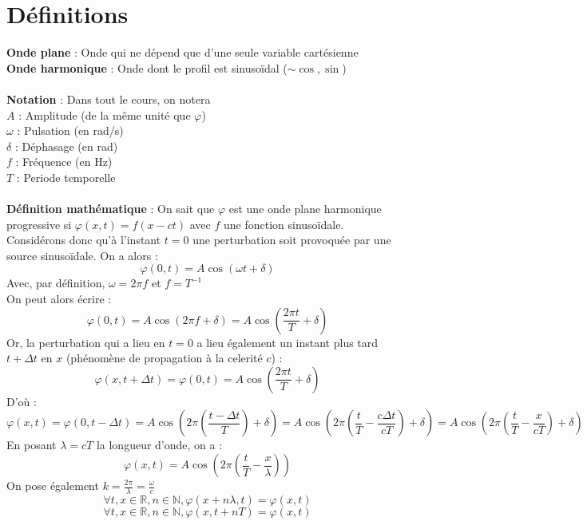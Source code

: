 \section{Définitions}
\noindent\textbf{Onde plane} : Onde qui ne dépend que d'une seule variable cartésienne \\
\textbf{Onde harmonique} : Onde dont le profil est sinusoïdal ($\sim \cos, \sin$) \\
\\
\textbf{Notation} : Dans tout le cours, on notera \\
\indent $A$ : Amplitude (de la même unité que $\varphi$) \\
\indent $\omega$ : Pulsation (en rad/s) \\
\indent $\delta$ : Déphasage (en rad) \\
\indent $f$ : Fréquence (en Hz)\\
\indent $T$ : Periode temporelle \\\\
\noindent\textbf{Définition mathématique} :
On sait que $\varphi$ est une onde plane harmonique progressive si $\varphi(x,t)=f(x-ct)$ avec $f$ une fonction sinusoïdale.\\
Considérons donc qu'à l'instant $t=0$ une perturbation soit provoquée par une source sinusoïdale. On a alors :
\[\varphi(0,t)=A\cos(\omega t +\delta)\]
Avec, par définition, $\omega=2\pi f$ et $f=T^{-1}$\\
On peut alors écrire : \[\varphi(0,t)=A\cos(2\pi f+\delta)=A\cos(\frac{2\pi t}{T}+\delta)\] 
Or, la perturbation qui a lieu en $t=0$ a lieu également un instant plus tard $t+\Delta t$ en $x$ (phénomène de propagation à la celerité $c$) :
\[\varphi(x,t+\Delta t)=\varphi(0,t)=A\cos(\frac{2\pi t}{T}+\delta)\]
D'où :
\[
\varphi(x,t)=\varphi(0,t-\Delta t)=A\cos(2\pi(\frac{t-\Delta t}{T})+\delta)=A\cos(2\pi(\frac{t}{T}-\frac{c\Delta t}{cT})+\delta)=
A\cos(2\pi(\frac{t}{T}-\frac{x}{cT})+\delta)
\]
En posant $\lambda=cT$ la longueur d'onde, on a :
\[\varphi(x,t)=A\cos(2\pi(\frac{t}{T}-\frac{x}{\lambda}))\]
On pose également $k=\frac{2\pi}{\lambda}=\frac{\omega}{c}$\\
\[\forall t,x\in \mathbb{R}, n\in\mathbb{N}, \varphi(x+n\lambda,t)=\varphi(x,t)\]
\[\forall t,x\in \mathbb{R}, n\in\mathbb{N}, \varphi(x,t+nT)=\varphi(x,t)\]

